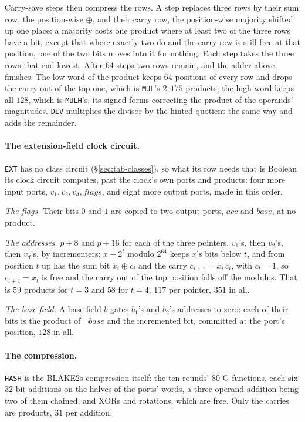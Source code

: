 Carry-save steps then compress the rows. A step replaces three rows by their sum row, the position-wise $\oplus$, and their carry row, the position-wise majority shifted up one place: a majority costs one product where at least two of the three rows have a bit, except that where exactly two do and the carry row is still free at that position, one of the two bits moves into it for nothing. Each step takes the three rows that end lowest. After $64$ steps two rows remain, and the adder above finishes. The low word of the product keeps $64$ positions of every row and drops the carry out of the top one, which is \texttt{MUL}'s $2{,}175$ products; the high word keeps all $128$, which is \texttt{MULH}'s, its signed forms correcting the product of the operands' magnitudes. \texttt{DIV} multiplies the divisor by the hinted quotient the same way and adds the remainder.

\paragraph{The extension-field clock circuit.} \texttt{EXT} has no class circuit (\S\ref{sec:tab-classes}), so what its row needs that is Boolean its clock circuit computes, past the clock's own ports and products: four more input ports, $v_1,v_2,v_d,\mathit{flags}$, and eight more output ports, made in this order.

\emph{The flags.} Their bits $0$ and $1$ are copied to two output ports, $\mathit{acc}$ and $\mathit{base}$, at no product.

\emph{The addresses.} $p+8$ and $p+16$ for each of the three pointers, $v_1$'s, then $v_2$'s, then $v_d$'s, by incrementers: $x+2^{t}$ modulo $2^{64}$ keeps $x$'s bits below $t$, and from position $t$ up has the sum bit $x_i\oplus c_i$ and the carry $c_{i+1}=x_i\,c_i$, with $c_t=1$, so $c_{t+1}=x_t$ is free and the carry out of the top position falls off the modulus. That is $59$ products for $t=3$ and $58$ for $t=4$, $117$ per pointer, $351$ in all.

\emph{The base field.} A base-field $b$ gates $b_1$'s and $b_2$'s addresses to zero: each of their bits is the product of $\neg\mathit{base}$ and the incremented bit, committed at the port's position, $128$ in all.

\paragraph{The compression.} \texttt{HASH} is the BLAKE2s compression itself: the ten rounds' $80$ G functions, each six $32$-bit additions on the halves of the ports' words, a three-operand addition being two of them chained, and XORs and rotations, which are free. Only the carries are products, $31$ per addition.

